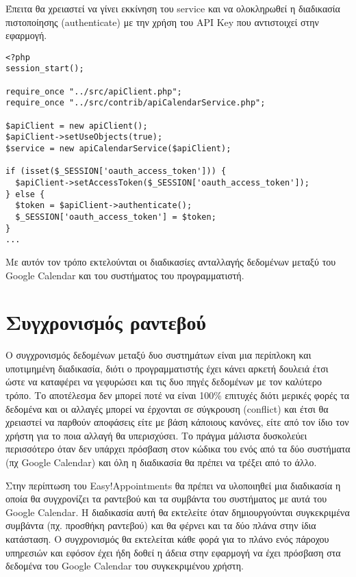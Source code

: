Έπειτα θα χρειαστεί να γίνει εκκίνηση του service και να ολοκληρωθεί η διαδικασία πιστοποίησης (authenticate) με την χρήση του API Key  που αντιστοιχεί στην εφαρμογή.

\begin{lstlisting}[breaklines=true]
<?php
session_start();

require_once "../src/apiClient.php";
require_once "../src/contrib/apiCalendarService.php";

$apiClient = new apiClient();
$apiClient->setUseObjects(true);
$service = new apiCalendarService($apiClient);

if (isset($_SESSION['oauth_access_token'])) {
  $apiClient->setAccessToken($_SESSION['oauth_access_token']);
} else {
  $token = $apiClient->authenticate();
  $_SESSION['oauth_access_token'] = $token;
}
...
\end{lstlisting}

Με αυτόν τον τρόπο εκτελούνται οι διαδικασίες ανταλλαγής δεδομένων μεταξύ του Google Calendar και του συστήματος του προγραμματιστή.

\section{Συγχρονισμός ραντεβού}
Ο συγχρονισμός δεδομένων μεταξύ δυο συστημάτων είναι μια περίπλοκη και υποτιμημένη διαδικασία, διότι ο προγραμματιστής έχει κάνει αρκετή δουλειά έτσι ώστε να καταφέρει να γεφυρώσει και τις δυο πηγές δεδομένων με τον καλύτερο τρόπο. Το αποτέλεσμα δεν μπορεί ποτέ να είναι 100\% επιτυχές διότι μερικές φορές τα δεδομένα και οι αλλαγές μπορεί να έρχονται σε σύγκρουση (conflict) και έτσι θα χρειαστεί να παρθούν αποφάσεις είτε με βάση κάποιους κανόνες, είτε από τον ίδιο τον χρήστη για το ποια αλλαγή θα υπερισχύσει. Το πράγμα μάλιστα δυσκολεύει περισσότερο όταν δεν υπάρχει πρόσβαση στον κώδικα του ενός από τα δύο συστήματα (πχ Google Calendar) και όλη η διαδικασία θα πρέπει να τρέξει από το άλλο. 

Στην περίπτωση του Easy!Appointments θα πρέπει να υλοποιηθεί μια διαδικασία η οποία θα συγχρονίζει τα ραντεβού και τα συμβάντα του συστήματος με αυτά του Google Calendar. Η διαδικασία αυτή θα εκτελείτε όταν δημιουργούνται συγκεκριμένα συμβάντα (πχ. προσθήκη ραντεβού) και θα φέρνει και τα δύο πλάνα στην ίδια κατάσταση. Ο συγχρονισμός θα εκτελείται κάθε φορά για το πλάνο ενός πάροχου υπηρεσιών και εφόσον έχει ήδη δοθεί η άδεια στην εφαρμογή να έχει πρόσβαση στα δεδομένα του Google Calendar του συγκεκριμένου χρήστη.

